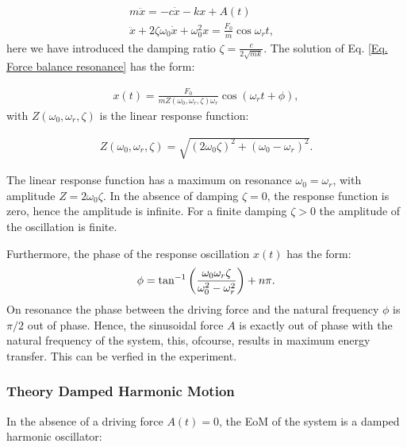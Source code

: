 \documentclass{article}
\begin{document}
\begin{align}
    m\ddot{x} = -c\dot{x} - kx + A(t) & \\
    \ddot{x} + 2\zeta\omega_0\dot{x} +\omega_0^2x = \frac{F_0}{m}\cos{\omega_r t},
    \label{Eq. Force balance resonance}
\end{align}
here we have introduced the damping ratio $\zeta = \frac{c}{2\sqrt{mk}}$. The solution of Eq. \ref{Eq. Force balance resonance} has the form:

\begin{align}
    x(t) = \frac{F_0}{m Z(\omega_0,\omega_r,\zeta) \omega_r}\cos(\omega_r t + \phi),
\end{align}
with $Z(\omega_0,\omega_r,\zeta)$ is the linear response function:

\begin{align}
    Z(\omega_0,\omega_r,\zeta) = \sqrt{(2\omega_0\zeta)^2 + (\omega_0-\omega_r)^2}.
\end{align}

The linear response function has a maximum on resonance $\omega_0=\omega_r$, with amplitude $Z = 2\omega_0\zeta$. In the absence of damping $\zeta = 0$, the response function is zero, hence the amplitude is infinite. For a finite damping $\zeta > 0$ the amplitude of the oscillation is finite.

Furthermore, the phase of the response oscillation $x(t)$ has the form: 
\begin{align}
    \phi = \tan^{-1}\bigg{(}\frac{\omega_0\omega_r\zeta}{\omega_0^2-\omega_r^2}\bigg{)} + n\pi.
\end{align}
On resonance the phase between the driving force and the natural frequency $\phi$ is $\pi/2$ out of phase. Hence, the sinusoidal force $A$ is exactly out of phase with the natural frequency of the system, this, ofcourse, results in maximum energy transfer.
This can be verfied in the experiment. 

\subsubsection{Theory Damped Harmonic Motion}

In the absence of a driving force $A(t) = 0$, the EoM of the system is a damped harmonic oscillator:
\end{document}
